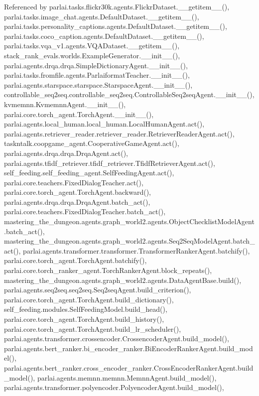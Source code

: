 Referenced by parlai.\+tasks.\+flickr30k.\+agents.\+Flickr\+Dataset.\+\_\+\+\_\+getitem\+\_\+\+\_\+(), parlai.\+tasks.\+image\+\_\+chat.\+agents.\+Default\+Dataset.\+\_\+\+\_\+getitem\+\_\+\+\_\+(), parlai.\+tasks.\+personality\+\_\+captions.\+agents.\+Default\+Dataset.\+\_\+\+\_\+getitem\+\_\+\+\_\+(), parlai.\+tasks.\+coco\+\_\+caption.\+agents.\+Default\+Dataset.\+\_\+\+\_\+getitem\+\_\+\+\_\+(), parlai.\+tasks.\+vqa\+\_\+v1.\+agents.\+V\+Q\+A\+Dataset.\+\_\+\+\_\+getitem\+\_\+\+\_\+(), stack\+\_\+rank\+\_\+evals.\+worlds.\+Example\+Generator.\+\_\+\+\_\+init\+\_\+\+\_\+(), parlai.\+agents.\+drqa.\+drqa.\+Simple\+Dictionary\+Agent.\+\_\+\+\_\+init\+\_\+\+\_\+(), parlai.\+tasks.\+fromfile.\+agents.\+Parlaiformat\+Teacher.\+\_\+\+\_\+init\+\_\+\+\_\+(), parlai.\+agents.\+starspace.\+starspace.\+Starspace\+Agent.\+\_\+\+\_\+init\+\_\+\+\_\+(), controllable\+\_\+seq2seq.\+controllable\+\_\+seq2seq.\+Controllable\+Seq2seq\+Agent.\+\_\+\+\_\+init\+\_\+\+\_\+(), kvmemnn.\+Kvmemnn\+Agent.\+\_\+\+\_\+init\+\_\+\+\_\+(), parlai.\+core.\+torch\+\_\+agent.\+Torch\+Agent.\+\_\+\+\_\+init\+\_\+\+\_\+(), parlai.\+agents.\+local\+\_\+human.\+local\+\_\+human.\+Local\+Human\+Agent.\+act(), parlai.\+agents.\+retriever\+\_\+reader.\+retriever\+\_\+reader.\+Retriever\+Reader\+Agent.\+act(), taskntalk.\+coopgame\+\_\+agent.\+Cooperative\+Game\+Agent.\+act(), parlai.\+agents.\+drqa.\+drqa.\+Drqa\+Agent.\+act(), parlai.\+agents.\+tfidf\+\_\+retriever.\+tfidf\+\_\+retriever.\+Tfidf\+Retriever\+Agent.\+act(), self\+\_\+feeding.\+self\+\_\+feeding\+\_\+agent.\+Self\+Feeding\+Agent.\+act(), parlai.\+core.\+teachers.\+Fixed\+Dialog\+Teacher.\+act(), parlai.\+core.\+torch\+\_\+agent.\+Torch\+Agent.\+backward(), parlai.\+agents.\+drqa.\+drqa.\+Drqa\+Agent.\+batch\+\_\+act(), parlai.\+core.\+teachers.\+Fixed\+Dialog\+Teacher.\+batch\+\_\+act(), mastering\+\_\+the\+\_\+dungeon.\+agents.\+graph\+\_\+world2.\+agents.\+Object\+Checklist\+Model\+Agent.\+batch\+\_\+act(), mastering\+\_\+the\+\_\+dungeon.\+agents.\+graph\+\_\+world2.\+agents.\+Seq2\+Seq\+Model\+Agent.\+batch\+\_\+act(), parlai.\+agents.\+transformer.\+transformer.\+Transformer\+Ranker\+Agent.\+batchify(), parlai.\+core.\+torch\+\_\+agent.\+Torch\+Agent.\+batchify(), parlai.\+core.\+torch\+\_\+ranker\+\_\+agent.\+Torch\+Ranker\+Agent.\+block\+\_\+repeats(), mastering\+\_\+the\+\_\+dungeon.\+agents.\+graph\+\_\+world2.\+agents.\+Data\+Agent\+Base.\+build(), parlai.\+agents.\+seq2seq.\+seq2seq.\+Seq2seq\+Agent.\+build\+\_\+criterion(), parlai.\+core.\+torch\+\_\+agent.\+Torch\+Agent.\+build\+\_\+dictionary(), self\+\_\+feeding.\+modules.\+Self\+Feeding\+Model.\+build\+\_\+head(), parlai.\+core.\+torch\+\_\+agent.\+Torch\+Agent.\+build\+\_\+history(), parlai.\+core.\+torch\+\_\+agent.\+Torch\+Agent.\+build\+\_\+lr\+\_\+scheduler(), parlai.\+agents.\+transformer.\+crossencoder.\+Crossencoder\+Agent.\+build\+\_\+model(), parlai.\+agents.\+bert\+\_\+ranker.\+bi\+\_\+encoder\+\_\+ranker.\+Bi\+Encoder\+Ranker\+Agent.\+build\+\_\+model(), parlai.\+agents.\+bert\+\_\+ranker.\+cross\+\_\+encoder\+\_\+ranker.\+Cross\+Encoder\+Ranker\+Agent.\+build\+\_\+model(), parlai.\+agents.\+memnn.\+memnn.\+Memnn\+Agent.\+build\+\_\+model(), parlai.\+agents.\+transformer.\+polyencoder.\+Polyencoder\+Agent.\+build\+\_\+model(), 
